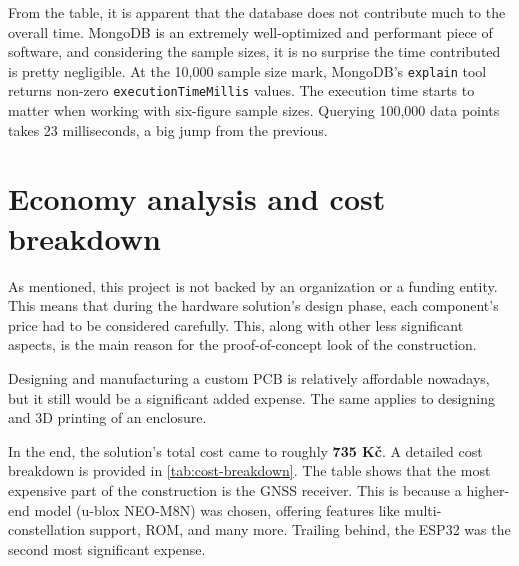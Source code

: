 \documentclass[FM,BP,EN,fonts]{tulthesis}
\begin{document}
From the table, it is apparent that the database does not contribute much to the overall time. MongoDB is an extremely well-optimized and performant piece of software, and considering the sample sizes, it is no surprise the time contributed is pretty negligible. At the 10,000 sample size mark, MongoDB's \verb|explain| tool returns non-zero \verb|executionTimeMillis| values. The execution time starts to matter when working with six-figure sample sizes. Querying 100,000 data points takes 23 milliseconds, a big jump from the previous.

\section{Economy analysis and cost breakdown}
As mentioned, this project is not backed by an organization or a funding entity. This means that during the hardware solution's design phase, each component's price had to be considered carefully. This, along with other less significant aspects, is the main reason for the proof-of-concept look of the construction. 

Designing and manufacturing a custom PCB is relatively affordable nowadays, but it still would be a significant added expense. The same applies to designing and 3D printing of an enclosure.

In the end, the solution's total cost came to roughly \textbf{735 Kč}. A detailed cost breakdown is provided in \autoref{tab:cost-breakdown}. The table shows that the most expensive part of the construction is the GNSS receiver. This is because a higher-end model (u-blox NEO-M8N) was chosen, offering features like multi-constellation support, ROM, and many more. Trailing behind, the ESP32 was the second most significant expense.
\end{document}
